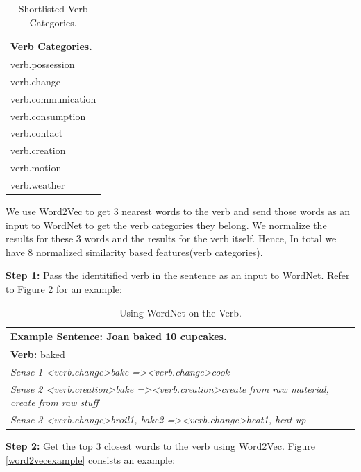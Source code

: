 \documentclass[11pt]{article}
\begin{document}
\begin{table}[h!]
\centering
\begin{tabular}{ | m{15em} | }
\hline
 \textbf{Verb Categories.}\\
\hline
verb.possession\\
\hline
verb.change\\
\hline
verb.communication\\
\hline
verb.consumption\\
\hline
verb.contact\\
\hline
verb.creation\\
\hline
verb.motion\\
\hline
verb.weather\\
\hline
\end{tabular}
\caption{Shortlisted Verb Categories.}
\label{figure:19}
\end{table}

We use Word2Vec to get 3 nearest words to the verb and send those words as an input to WordNet to get the verb categories they belong. We normalize the results for these 3 words and the results for the verb itself. Hence, In total we have 8 normalized similarity based features(verb categories).

\textbf{Step 1:} Pass the identitified verb in the sentence as an input to WordNet. Refer to Figure \ref{wordnetexample} for an example:

\begin{table}[h!]
\centering
\begin{tabular}{ | m{30em} |}
\hline
\textbf{Example Sentence:} Joan baked 10 cupcakes.\\
\hline
 \textbf{Verb:} baked\\
\hline
\textit{Sense 1 \textless verb.change\textgreater bake =\textgreater \textless verb.change\textgreater cook}\\
\hline
\textit{Sense 2 \textless verb.creation\textgreater bake =\textgreater \textless verb.creation\textgreater create from raw material, create from raw stuff}\\
\hline
\textit{Sense 3 \textless verb.change\textgreater broil1, bake2 =\textgreater \textless verb.change\textgreater heat1, heat up}\\
\hline
\end{tabular}
\caption{Using WordNet on the Verb.}
\label{wordnetexample}
\end{table}

\textbf{Step 2:} Get the top 3 closest words to the verb using Word2Vec. Figure \ref{word2vecexample} consists an example:
\end{document}
